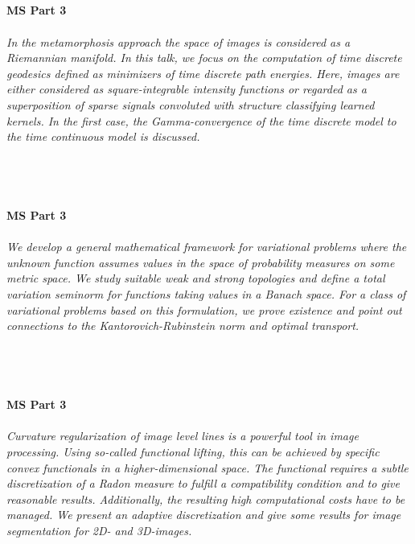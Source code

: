 \begin{multicols}{2}
\\ 
    \\
    \\\\
    \noindent\textbf{MS Part 3}\\
\\  
    \textit{In the metamorphosis approach the space of images is considered as a Riemannian manifold.
In this talk, we focus on the computation of time discrete geodesics
defined as minimizers of time discrete path energies.
Here, images are either considered as square-integrable intensity functions
or regarded as a superposition of sparse signals convoluted
with structure classifying learned kernels.
In the first case, the Gamma-convergence of the time discrete model to the time continuous model is discussed. }\\
\\ 
    \\
    \\\\
    \noindent\textbf{MS Part 3}\\
\\  
    \textit{We develop a general mathematical framework for variational problems where the unknown function assumes values in the space of probability measures on some metric space. We study suitable weak and strong topologies and define a total variation seminorm for functions taking values in a Banach space. For a class of variational problems based on this formulation, we prove existence and point out connections to the Kantorovich-Rubinstein norm and optimal transport.}\\
\\ 
    \\
    \\\\
    \noindent\textbf{MS Part 3}\\
\\  
    \textit{Curvature regularization of image level lines is a powerful tool in image processing. Using so-called functional lifting, this can be achieved by specific convex functionals in a higher-dimensional space. The functional requires a subtle discretization of a Radon measure to fulfill a compatibility condition and to give reasonable results. Additionally, the resulting high computational costs have to be managed. We present an adaptive discretization and give some results for image segmentation for 2D- and 3D-images.}\\

\end{multicols}
